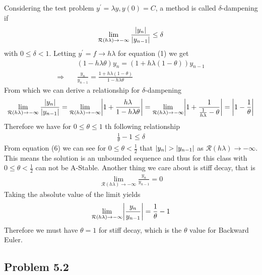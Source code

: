 \documentclass[12pt]{article}
\DeclarePairedDelimiter \abs{\lvert}{\rvert}%
\DeclarePairedDelimiter \babs{\bigg\lvert}{\bigg\rvert}%
\theoremstyle{remark}
\begin{document}
Considering the test problem $y^\prime = \lambda y, y(0) = C$, a method is called $\delta$-dampening if
\begin{align}
	\lim\limits_{\mathcal{R}(h\lambda)\rightarrow -\infty}\frac{\abs{y_n}}{\abs{y_{n-1}}} \leq \delta
\end{align}
with $0 \leq \delta < 1$. Letting $y^\prime = f \rightarrow h\lambda$ for equation (1) we get
\begin{align*}
	& (1 - h\lambda\theta)y_n = (1 + h\lambda(1-\theta))y_{n-1} \\
	\Rightarrow \quad & \frac{y_n}{y_{n-1}} = \frac{1 + h\lambda(1-\theta)}{1 - h\lambda\theta}
\end{align*}
From which we can derive a relationship for $\delta$-dampening
\begin{align*}
	\lim\limits_{\mathcal{R}(h\lambda)\rightarrow -\infty} \frac{\abs{y_n}}{\abs{y_{n-1}}} = \lim\limits_{\mathcal{R}(h\lambda)\rightarrow -\infty} \babs{1 + \frac{h\lambda}{1 - h\lambda\theta}} = \lim\limits_{\mathcal{R}(h\lambda)\rightarrow -\infty}\babs{1 + \frac{1}{\frac{1}{h\lambda} - \theta}} = \babs{1 - \frac{1}{\theta}}
\end{align*}
Therefore we have for $0 \leq \theta \leq 1$ th following relationship
\begin{align}
	\frac{1}{\theta} - 1 \leq \delta
\end{align}
From equation (6) we can see for $0 \leq \theta < \frac{1}{2}$ that $\abs{y_n} > \abs{y_{n-1}}$ as $\mathcal{R}(h\lambda) \rightarrow -\infty$. This means the solution is an unbounded sequence and thus for this class with $0 \leq \theta < \frac{1}{2}$ can not be A-Stable. Another thing we care about is stiff decay, that is
\begin{align}
	\lim\limits_{\mathcal{R}(h\lambda) \rightarrow -\infty} \frac{y_n}{y_{n-1}} = 0
\end{align}
Taking the absolute value of the limit yields
\begin{align*}
	\lim\limits_{\mathcal{R}(h\lambda) \rightarrow -\infty} \babs{\frac{y_n}{y_{n-1}}} = \frac{1}{\theta} - 1
\end{align*}
Therefore we must have $\theta = 1$ for stiff decay, which is the $\theta$ value for Backward Euler.

\newpage

\subsection{Problem 5.2}
\end{document}
